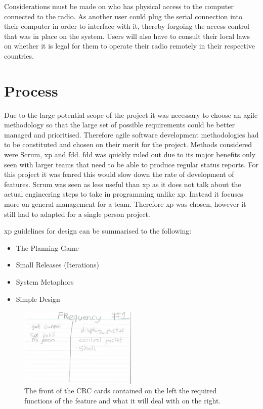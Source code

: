 Considerations must be made on who has physical access to the computer connected to the radio. As another user could plug the serial connection into their computer in order to interface with it, thereby forgoing the access control that was in place on the system. Users will also have to consult their local laws on whether it is legal for them to operate their radio remotely in their respective countries. 

\section{Process}
Due to the large potential scope of the project it was necessary to choose an agile methodology so that the large set of possible requirements could be better managed and prioritised. Therefore agile software development methodologies had to be constituted and chosen on their merit for the project. Methods considered were Scrum, \gls{xp} and \gls{fdd}. \gls{fdd} was quickly ruled out due to its major benefits only seen with larger teams that need to be able to produce regular status reports. For this project it was feared this would slow down the rate of development of features. Scrum was seen as less useful than \gls{xp} as it does not talk about the actual engineering steps to take in programming unlike \gls{xp}. Instead it focuses more on general management for a team. Therefore \gls{xp}\cite{extreme_programming} was chosen, however it still had to adapted for a single person project.

\gls{xp} guidelines for design can be summarised to the following\cite{xp}:
\begin{itemize}
    \item The Planning Game
    \item Small Releases (Iterations)
    \item System Metaphors
    \item Simple Design 	
\end{itemize}

\begin{figure}
    \centering
    \includegraphics[width=0.5\textwidth]{img/crc_front}
    \caption[CRC front]{The front of the CRC cards contained on the left the required functions of the feature and what it will deal with on the right.}
    \label{fig:crc_front}
\end{figure}

